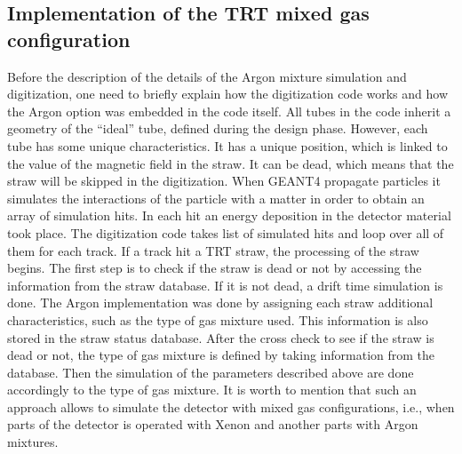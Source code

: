 \subsection{Implementation of the TRT mixed gas configuration}
Before the description of the details of the Argon mixture simulation and digitization, one need to briefly explain how the digitization code works and how the Argon option was embedded in the code itself.
All tubes in the code inherit a geometry of the ``ideal'' tube, defined during the design phase. However, each tube has some unique characteristics. It has a unique position, 
which is linked to the value of the magnetic field in the straw. It can be dead, which means that the straw will be skipped in the digitization.
When GEANT4 propagate particles it simulates the interactions of the particle with a matter in order to obtain an array of simulation hits. In each hit an energy deposition in the 
detector material took place. The digitization code takes list of simulated hits and loop over all of them for each track. If a track hit a TRT straw, the processing of the straw begins.
The first step is to check if the straw is dead or not by accessing the information from the straw database.
If it is not dead, a drift time simulation is done.
The Argon implementation was done by assigning each straw additional characteristics, such as the type of gas mixture used. This information is also stored in the straw status database.
After the cross check to see if the straw is dead or not, the type of gas mixture is defined by taking information from the database.
Then the simulation of the parameters described above are done accordingly to the type of gas mixture.
It is worth to mention that such an approach allows to simulate the detector with mixed gas configurations, i.e., when parts of the detector is operated with Xenon and another parts with Argon mixtures.

